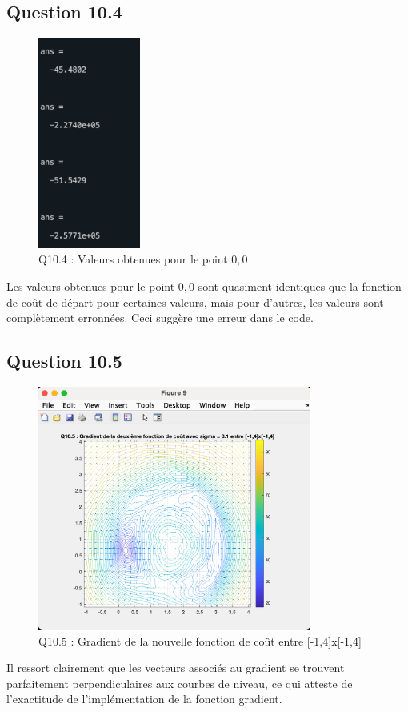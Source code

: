 \documentclass[12pt]{article}
\begin{document}
\subsection{Question 10.4}
\begin{figure}[H]
    \centering
    \includegraphics[width=0.3\textwidth]{Q10.4.png} 
    \caption{Q10.4 : Valeurs obtenues pour le point \(0,0\)}
\end{figure}
Les valeurs obtenues pour le point \(0,0\) sont quasiment identiques que la fonction de coût de départ pour certaines valeurs, mais pour d'autres, les valeurs sont complètement erronnées. Ceci suggère une erreur dans le code. 

\subsection{Question 10.5}
\begin{figure}[H]
    \centering
    \includegraphics[width=0.8\textwidth]{Q10.5.png} 
    \caption{Q10.5 : Gradient de la nouvelle fonction de coût entre [-1,4]x[-1,4]}
\end{figure}
Il ressort clairement que les vecteurs associés au gradient se trouvent parfaitement perpendiculaires aux courbes de niveau, ce qui atteste de l’exactitude de l’implémentation de la fonction gradient.
\end{document}
